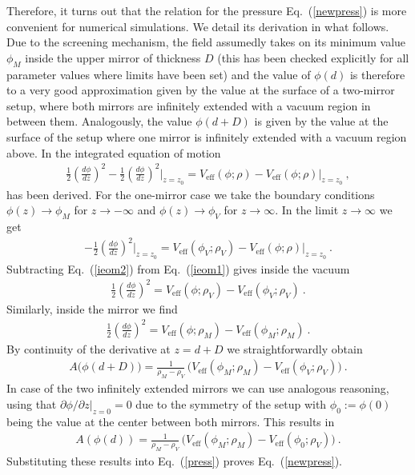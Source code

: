 \documentclass[aps,pra,twocolumn,floatfix,superscriptaddress,nofootinbib,showpacs,a4paper,balancelastpage,twoside]{revtex4-2}
\begin{document}
Therefore, it turns out that the relation for the pressure  Eq.~(\ref{newpress})  is more convenient for  numerical simulations. We detail its derivation in what follows. Due to the screening mechanism, the field assumedly takes on its minimum value $\phi_{M}$ inside the upper mirror of thickness $D$  (this has been checked explicitly for all parameter values where limits have been set) and the value of $\phi(d)$ is therefore to a very good approximation given by the value at the surface of a two-mirror setup, where both mirrors are infinitely extended with a vacuum region in between them. Analogously, the value $\phi(d+D)$ is given by the value at the surface of the setup where one mirror is infinitely extended with a vacuum region above. 
In \cite{Brax:2022uyh} the integrated equation of motion  
\begin{align}
\frac{1}{2}\left(\frac{d \phi}{dz}\right)^2 - \frac{1}{2}\left(\frac{d \phi}{dz}\right)^2\bigg|_{z=z_0}  =  V_{\text{eff}}(\phi; \rho) -  V_{\text{eff}}(\phi; \rho)\big|_{z=z_0}\>, \label{ieom1}
\end{align}
has been derived. For the one-mirror case we take the boundary conditions $\phi(z)\rightarrow \phi_{M}$ for $z \rightarrow -\infty$ and $\phi(z)\rightarrow \phi_V$ for $z \rightarrow \infty$. In the limit $z \rightarrow \infty$ we get
\begin{align}
 - \frac{1}{2}\left(\frac{d \phi}{dz}\right)^2\bigg|_{z=z_0}  =  V_{\text{eff}}(\phi_V; \rho_V) -  V_{\text{eff}}(\phi; \rho)\big|_{z=z_0}\>. \label{ieom2}
\end{align}
Subtracting Eq.~(\ref{ieom2}) from Eq.~(\ref{ieom1}) gives inside the vacuum
\begin{align}
\frac{1}{2}\left(\frac{d \phi}{dz}\right)^2  =  V_{\text{eff}}(\phi; \rho_V) -  V_{\text{eff}}(\phi_V; \rho_V)\>.
\end{align}
Similarly, inside the mirror we find 
\begin{align}
\frac{1}{2}\left(\frac{d \phi}{dz}\right)^2  =  V_{\text{eff}}(\phi; \rho_M) -  V_{\text{eff}}(\phi_M; \rho_M)\>.
\end{align}
By continuity of the derivative at $z=d+D$ we straightforwardly obtain
\begin{align}
 A\big(\phi(d+D)\big) = \frac{1}{\rho_M-\rho_V}\,\big( V_{\text{eff}}(\phi_M; \rho_M)-V_{\text{eff}}(\phi_V; \rho_V)\big)\>. 
\end{align}
In case of the two infinitely extended mirrors we can use analogous reasoning, using that $\partial \phi / \partial z|_{z=0} =0$ due to the symmetry of the setup with $\phi_0:= \phi(0)$ being the value at the center between both mirrors. This results in
\begin{align}
 A(\phi(d)) = \frac{1}{\rho_M-\rho_V}\,\big( V_{\text{eff}}(\phi_M; \rho_M)-V_{\text{eff}}(\phi_0; \rho_V)\big)\>. \label{A1}
\end{align}
Substituting these results into Eq.~(\ref{press}) proves Eq.~(\ref{newpress}).
\end{document}
